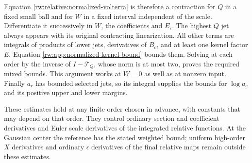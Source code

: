 Equation \eqref{rw:relative:normalized-volterra} is therefore a
contraction for $Q$ in a fixed small ball and for $W$ in a fixed
interval independent of the scale. Differentiate it successively in
$W$, the coefficients and $E_\epsilon$. The highest $Q$ jet always
appears with its original contracting linearization. All other terms
are integrals of products of lower jets, derivatives of $B_c$, and
at least one kernel factor $E$. Equation
\eqref{rw:app:normalized-kernel-bound} bounds them. Solving at each
order by the inverse of $I-\mathcal T_Q$, whose norm is at most two,
proves the required mixed bounds. This argument works at $W=0$ as
well as at nonzero input. Finally $a_r$ has bounded selected jets,
so its integral supplies the bounds for $\log a_c$ and its positive
upper and lower margins.

These estimates hold at any finite order chosen in advance, with
constants that may depend on that order.  They control ordinary
section and coefficient derivatives and Euler scale derivatives of
the integrated relative functions.  At the Gaussian center the
reference has the stated weighted bound; uniform high-order
$X$ derivatives and ordinary $\epsilon$ derivatives of the final
relative maps remain outside these estimates.
